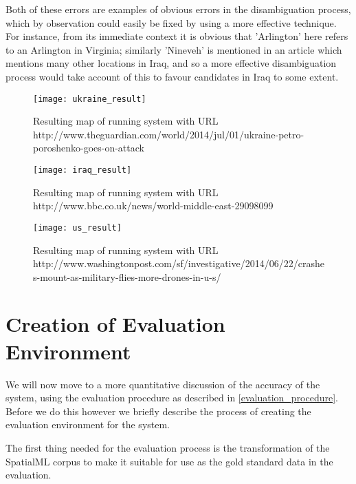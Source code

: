 \documentclass[12pt, a4paper]{report}
\begin{document}
Both of these errors are examples of obvious errors in the disambiguation process, which by observation could easily be fixed by using a more effective technique. For instance, from its immediate context it is obvious that 'Arlington' here refers to an Arlington in Virginia; similarly 'Nineveh' is mentioned in an article which mentions many other locations in Iraq, and so a more effective disambiguation process would take account of this to favour candidates in Iraq to some extent. 



\begin{figure}[h!]
  \centering
  \texttt{[image: ukraine\_result]}
  \caption{Resulting map of running system with URL http://www.theguardian.com/world/2014/jul/01/ukraine-petro-poroshenko-goes-on-attack}
  \label{fig:ukraine_result}
\end{figure}

\begin{figure}[h!]
  \centering
  \texttt{[image: iraq\_result]}
  \caption{Resulting map of running system with URL http://www.bbc.co.uk/news/world-middle-east-29098099}
  \label{fig:iraq_result}
\end{figure}

\begin{figure}[h!]
  \centering
  \texttt{[image: us\_result]}
  \caption{Resulting map of running system with URL http://www.washingtonpost.com/sf/investigative/2014/06/22/crashes-mount-as-military-flies-more-drones-in-u-s/}
  \label{fig:us_result}
\end{figure}


\section{Creation of Evaluation Environment}
\label{sec:creation_evaluation_environment}

We will now move to a more quantitative discussion of the accuracy of the system, using the evaluation procedure as described in \ref{evaluation_procedure}. Before we do this however we briefly describe the process of creating the evaluation environment for the system.

The first thing needed for the evaluation process is the transformation of the SpatialML corpus to make it suitable for use as the gold standard data in the evaluation.
\end{document}
